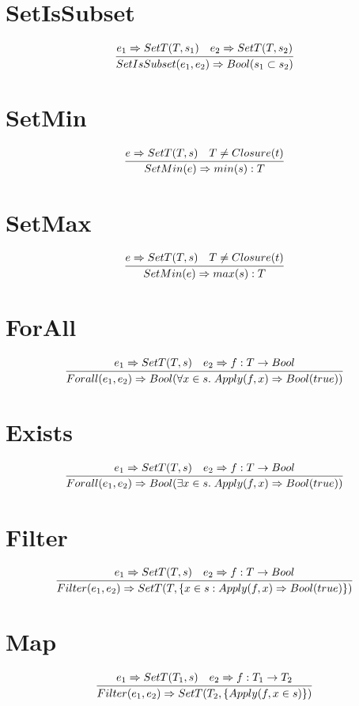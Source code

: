 \documentclass{article}
\begin{document}
\section{SetIsSubset}
\begin{equation*}
	\infer{SetIsSubset(e_1, e_2) \Rightarrow Bool(s_1 \subset s_2)}{e_1 \Rightarrow SetT(T, s_1) & e_2 \Rightarrow SetT(T, s_2)}
\end{equation*}
\section{SetMin}
\begin{equation*}
	\infer{SetMin(e) \Rightarrow min(s):T}{e \Rightarrow SetT(T, s) & T \neq Closure(t)}
\end{equation*}
\section{SetMax}
\begin{equation*}
	\infer{SetMin(e) \Rightarrow max(s):T}{e \Rightarrow SetT(T, s) & T \neq Closure(t)}
\end{equation*}
\section{ForAll}
\begin{equation*}
	\infer{Forall(e_1, e_2) \Rightarrow Bool(\forall x \in s.\; Apply(f, x) \Rightarrow Bool(true))}{e_1 \Rightarrow SetT(T, s) & e_2 \Rightarrow f:T \rightarrow Bool}
\end{equation*}
\section{Exists}
\begin{equation*}
	\infer{Forall(e_1, e_2) \Rightarrow Bool(\exists x \in s.\; Apply(f, x) \Rightarrow Bool(true))}{e_1 \Rightarrow SetT(T, s) & e_2 \Rightarrow f:T \rightarrow Bool}
\end{equation*}
\section{Filter}
\begin{equation*}
	\infer{Filter(e_1, e_2) \Rightarrow SetT(T, \{x \in s : Apply(f, x) \Rightarrow Bool(true)\})}{e_1 \Rightarrow SetT(T, s) & e_2 \Rightarrow f:T \rightarrow Bool}
\end{equation*}
\section{Map}
\begin{equation*}	\infer{Filter(e_1, e_2) \Rightarrow SetT(T_2, \{Apply(f,x \in s)\})}{e_1 \Rightarrow SetT(T_1, s) & e_2 \Rightarrow f:T_1 \rightarrow T_2}
\end{equation*}
\end{document}
